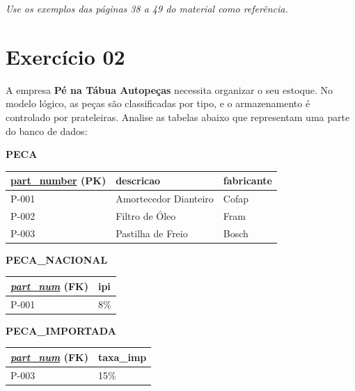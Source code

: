\documentclass[12pt]{article}
\begin{document}
\begin{flushright}
\textit{Use os exemplos das páginas 38 a 49 do material como referência.}
\end{flushright}
\section*{Exercício 02}

A empresa \textbf{Pé na Tábua Autopeças} necessita organizar o seu estoque. No modelo lógico, as peças são classificadas por tipo, e o armazenamento é controlado por prateleiras. Analise as tabelas abaixo que representam uma parte do banco de dados:

\begin{table}[H]
    \centering
    \small
    
    \textbf{PECA}\\
    \begin{tabular}{|l|l|l|}
    \hline
    \rowcolor{tableheader} \underline{part\_number} (PK) & descricao & fabricante \\ \hline
    P-001 & Amortecedor Dianteiro & Cofap \\ \hline
    P-002 & Filtro de Óleo & Fram \\ \hline
    P-003 & Pastilha de Freio & Bosch \\ \hline
    \end{tabular}

    \vspace{0.4cm}

    \begin{minipage}{0.48\textwidth}
        \centering
        \textbf{PECA\_NACIONAL}\\
        \begin{tabular}{|l|l|}
        \hline
        \rowcolor{tableheader} \underline{\textit{part\_num}} (FK) & ipi \\ \hline
        P-001 & 8\% \\ \hline
        \end{tabular}
    \end{minipage}
    \begin{minipage}{0.48\textwidth}
        \centering
        \textbf{PECA\_IMPORTADA}\\
        \begin{tabular}{|l|l|}
        \hline
        \rowcolor{tableheader} \underline{\textit{part\_num}} (FK) & taxa\_imp \\ \hline
        P-003 & 15\% \\ \hline
        \end{tabular}
    \end{minipage}


\end{table}
\end{document}

